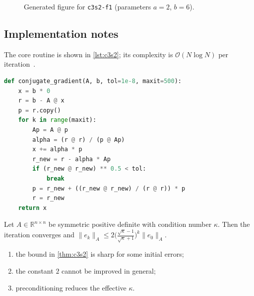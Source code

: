 \begin{figure}[htbp]
\centering
{}
\caption{Generated figure for \texttt{c3s2-f1} (parameters $a=2$, $b=6$).}\label{fig:c3s2-f1}
\end{figure}

\lipsum[79-80]

\subsection{Implementation notes}\label{sec:c3s2-i}
The core routine is shown in \cref{lst:c3s2}; its complexity is $\mathcal{O}(N\log N)$ per iteration~\cite{ch3-9}.

\begin{lstlisting}[language=python,caption={Reference implementation for c3s2.},label={lst:c3s2}]
def conjugate_gradient(A, b, tol=1e-8, maxit=500):
    x = b * 0
    r = b - A @ x
    p = r.copy()
    for k in range(maxit):
        Ap = A @ p
        alpha = (r @ r) / (p @ Ap)
        x += alpha * p
        r_new = r - alpha * Ap
        if (r_new @ r_new) ** 0.5 < tol:
            break
        p = r_new + ((r_new @ r_new) / (r @ r)) * p
        r = r_new
    return x
\end{lstlisting}

\kant[9-11]
\begin{theorem}\label{thm:c3s2}
Let $A\in\mathbb{R}^{n\times n}$ be symmetric positive definite with condition number $\kappa$. Then the iteration converges and
$\lVert e_k\rVert_A \le 2\bigl(\tfrac{\sqrt\kappa-1}{\sqrt\kappa+1}\bigr)^k\lVert e_0\rVert_A$.
\end{theorem}
\begin{enumerate}[label=(\roman*)]
\item the bound in \cref{thm:c3s2} is sharp for some initial errors;
\item the constant $2$ cannot be improved in general;
\item preconditioning reduces the effective $\kappa$.
\end{enumerate}

\lipsum[76-76]
